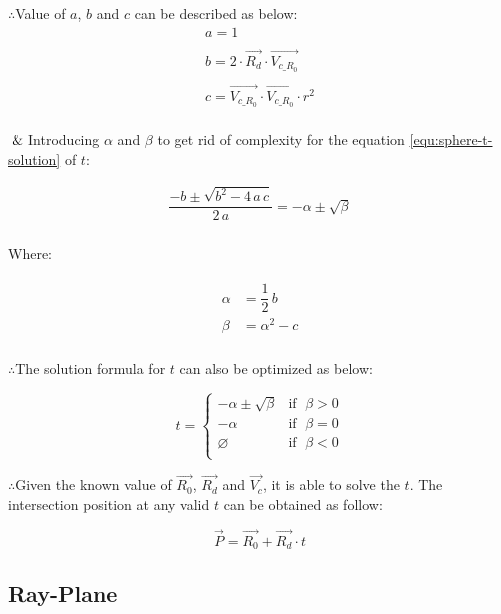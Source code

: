 $\therefore$\;\;\;\;Value of $a$, $b$ and $c$ can be described as below:
\[
\begin{array}{lr}
a =1\\\\
b = 2 \cdot \overrightarrow{R_d} \cdot \overrightarrow{V_{c\_R_0}}\\\\
c = \overrightarrow{V_{c\_R_0}} \cdot \overrightarrow{V_{c\_R_0}} \cdot r^2\\
\end{array}
\]

$\And$\;\;\;\;Introducing $\alpha$ and $\beta$ to get rid of complexity for the equation \ref{equ:sphere-t-solution} of $t$:

\[
\begin{array}{lr}
\dfrac{-b \pm \sqrt{b^2 - 4\,a\,c}}{2\,a} = -\alpha \pm \sqrt{\beta}\\
\end{array}
\]

Where:

\[
\begin{array}{lr}
\begin{aligned}
\alpha &= \dfrac{1}{2}\,b\\
\beta &= \alpha^2 - c\\
\end{aligned}
\end{array}
\]

$\therefore$\;\;\;\;The solution formula for $t$ can also be optimized as below:

\[
t =
\begin{cases}
 -\alpha \pm \sqrt{\beta} & \text{if }\;\beta > 0\\
-\alpha & \text{if }\;\beta = 0\\
\varnothing & \text{if }\;\beta < 0\\
\end{cases}
\]

$\therefore$\;\;\;\;Given the known value of $\overrightarrow{R_0}$, $\overrightarrow{R_d}$ and $\overrightarrow{V_c}$, it is able to solve the $t$. The intersection position at any valid $t$ can be obtained as follow:

\[
\overrightarrow{P} = \overrightarrow{R_0} + \overrightarrow{R_d} \cdot t
\]

\subsection{Ray-Plane}

